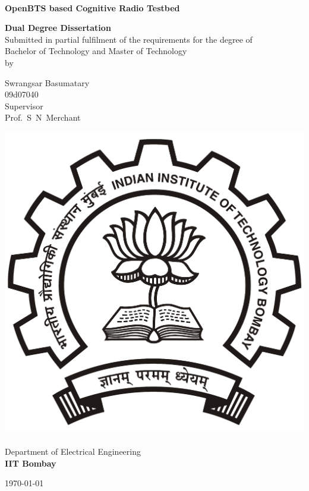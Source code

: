 \begin{titlepage}
\begin{center}
\begin{spacing}{1.0}


~\\[0.3cm]
{ \LARGE \bfseries OpenBTS based Cognitive Radio Testbed\\[1.2cm] }

\textbf{\large Dual Degree Dissertation}\\[1.2cm]

{Submitted in partial fulfilment of the requirements for the degree 
of\\[0.1cm]
Bachelor of Technology and Master of Technology\\[0.3cm]
by\\[0.3cm]}

{\LARGE Swrangsar Basumatary \\[0.1cm]}
{09d07040 \\[1.1cm]}
{Supervisor \\[0.1cm]}
{\LARGE Prof.~S~N~Merchant \\[1.3cm]}

\includegraphics[width=0.21\textheight]{iitbLogo}~\\[0.9cm]
Department of Electrical Engineering\\[0.2cm]
\textbf{\large IIT Bombay}\\[1.3cm]


\vfill

{\large \mydate\today}

\end{spacing}
\end{center}
\end{titlepage}
